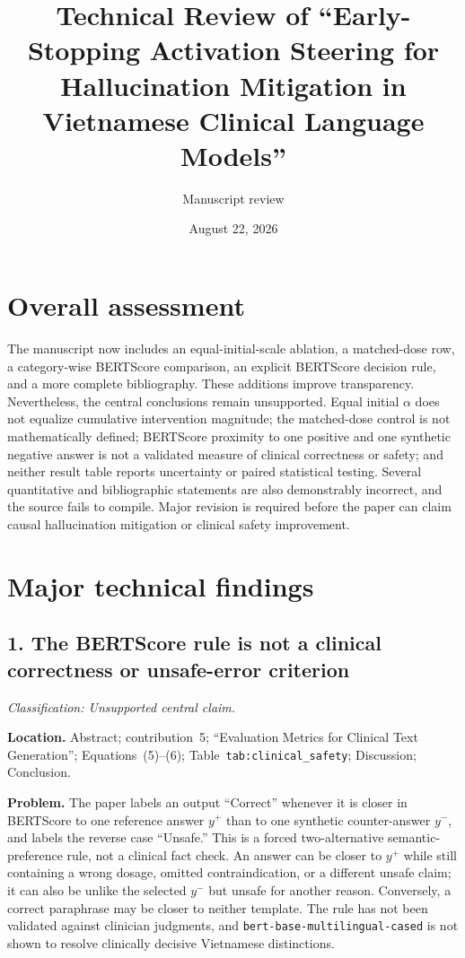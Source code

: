 \documentclass[11pt]{article}
\title{Technical Review of ``Early-Stopping Activation Steering for Hallucination Mitigation in Vietnamese Clinical Language Models''}
\author{Manuscript review}
\date{August 22, 2026}
\newcommand{\findinglabel}[1]{\textbf{#1}}
\newcommand{\classification}[1]{\textit{Classification: #1.}}
\begin{document}
\maketitle

\section*{Overall assessment}

The manuscript now includes an equal-initial-scale ablation, a matched-dose row, a category-wise BERTScore comparison, an explicit BERTScore decision rule, and a more complete bibliography.  These additions improve transparency.  Nevertheless, the central conclusions remain unsupported.  Equal initial $\alpha$ does not equalize cumulative intervention magnitude; the matched-dose control is not mathematically defined; BERTScore proximity to one positive and one synthetic negative answer is not a validated measure of clinical correctness or safety; and neither result table reports uncertainty or paired statistical testing.  Several quantitative and bibliographic statements are also demonstrably incorrect, and the source fails to compile.  Major revision is required before the paper can claim causal hallucination mitigation or clinical safety improvement.

\section*{Major technical findings}

\subsection*{1. The BERTScore rule is not a clinical correctness or unsafe-error criterion}

\classification{Unsupported central claim}

\findinglabel{Location.} Abstract; contribution~5; ``Evaluation Metrics for Clinical Text Generation''; Equations~(5)--(6); Table~\texttt{tab:clinical\_safety}; Discussion; Conclusion.

\findinglabel{Problem.} The paper labels an output ``Correct'' whenever it is closer in BERTScore to one reference answer $y^+$ than to one synthetic counter-answer $y^-$, and labels the reverse case ``Unsafe.''  This is a forced two-alternative semantic-preference rule, not a clinical fact check.  An answer can be closer to $y^+$ while still containing a wrong dosage, omitted contraindication, or a different unsafe claim; it can also be unlike the selected $y^-$ but unsafe for another reason.  Conversely, a correct paraphrase may be closer to neither template.  The rule has not been validated against clinician judgments, and \texttt{bert-base-multilingual-cased} is not shown to resolve clinically decisive Vietnamese distinctions.
\end{document}
